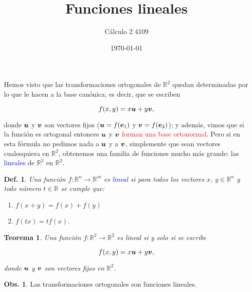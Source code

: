 \documentclass{article}
\title{\Huge{Funciones lineales}}
\author{Cálculo 2 4109}
\date{\today}
\theoremstyle{definicion}
\newtheorem{definicion}{Def.}
\theoremstyle{definition}             %
\theoremstyle{definition}             %
\theoremstyle{definition}
\theoremstyle{definition}
\theoremstyle{observacion}
\newtheorem{obs}{Obs.}
\theoremstyle{definition}
\theoremstyle{plain}
\newtheorem{theorem}{Teorema}
\theoremstyle{definition}
\theoremstyle{afirmacion}
\theoremstyle{definition}
\begin{document}
    \maketitle

    Hemos visto que las transformaciones ortogonales de \(\mathbb{R}^{2}\) quedan determinadas por lo que le hacen a la base canónica; es decir, que se escriben

    \begin{equation*}
        f(x, y) = x\vb*{u} + y\vb*{v},
    \end{equation*}

    donde \(\vb*{u}\) y \(\vb*{v}\) son vectores fijos (\(\vb*{u} = f(\vb*{e}_{1})\) y \(\vb*{v} = f(\vb*{e}_{2})\)); y además, vimos que si la función es ortogonal entonces \(\vb*{u}\) y \(\vb*{v}\) \textcolor{red}{forman una base ortonormal}. Pero si en esta fórmula no pedimos nada a \(\vb*{u}\) y a \(\vb*{v}\), simplemente que sean vectores cualesquiera en \(\mathbb{R}^{2}\), obtenemos una familia de funciones mucho más grande: las \textcolor{blue}{lineales} de \(\mathbb{R}^{2}\) en \(\mathbb{R}^{2}\).

    \begin{definicion}
        Una función \(f \colon \mathbb{R}^{n} \to \mathbb{R}^{m}\) es \textcolor{blue}{lineal} si para todos los vectores \(x,\ y\in \mathbb{R}^{n}\) y todo número \(t\in\mathbb{R}\) se cumple que:

        \begin{enumerate}[label = \Roman*)]
            \item \(f(x + y) = f(x) + f(y)\)
            \item \(f(tx) = tf(x)\).
        \end{enumerate}
    \end{definicion}

    \begin{theorem}
        Una función \(f \colon \mathbb{R}^{2} \to \mathbb{R}^{2}\) es lineal si y solo si se escribe

        \begin{equation*}
            f(x, y) = x\vb*{u} + y\vb*{v},
        \end{equation*}

        donde \(\vb*{u}\) y \(\vb*{v}\) son vectores fijos en \(\mathbb{R}^{2}\).
    \end{theorem}

    \begin{obs}
        Las transformaciones ortogonales son funciones lineales.
    \end{obs}
\end{document}
